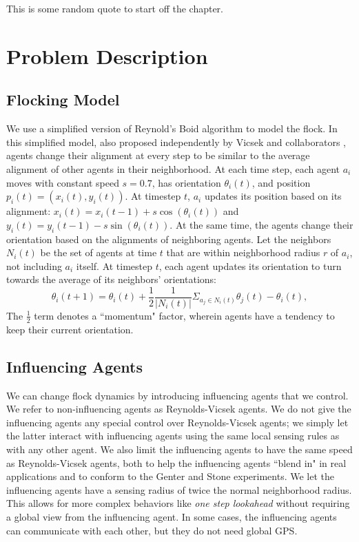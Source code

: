 \begin{savequote}[75mm]
This is some random quote to start off the chapter.
\end{savequote}

\chapter{Problem Description}
\label{ch:problem}

\section{Flocking Model}
We use a simplified version of Reynold's Boid algorithm \cite{reynoldsmodel}
to model the flock.
In this simplified model, also proposed independently by Vicsek and
collaborators \cite{vicsek1995},
agents change their alignment at every step to be similar to the average
alignment of other agents in their neighborhood.
At each time step, each agent $a_i$ moves with constant speed $s=0.7$, has
orientation $\theta_i(t)$, and position $p_i(t) = (x_i(t), y_i(t))$.
At timestep $t$, $a_i$ updates its position based on its alignment:
$x_i(t) = x_i(t-1) + s\cos(\theta_i(t))$ and
$y_i(t) = y_i (t-1) - s\sin(\theta_i(t))$.
At the same time, the agents change their orientation based on the alignments
of neighboring agents.
Let the neighbors $N_i(t)$ be the set of agents at time $t$ that are within
neighborhood radius $r$ of $a_i$, not including $a_i$ itself.
At timestep $t$, each agent updates its orientation to turn towards the average
of its neighbors' orientations:
\[\theta_i(t+1)=\theta_i(t)+\frac{1}{2}\frac{1}{|N_i(t)|} \Sigma_{a_j \in
N_i(t)} \theta_j(t) - \theta_i(t),\]
The $\frac{1}{2}$ term denotes a ``momentum" factor, wherein agents have
a tendency to keep their current orientation.

\section{Influencing Agents}
We can change flock dynamics by introducing influencing agents that we control.
We refer to non-influencing agents as Reynolds-Vicsek agents.
We do not give the influencing agents any special control over Reynolds-Vicsek
agents; we simply let the latter interact with influencing agents using the
same local sensing rules as with any other agent.
We also limit the influencing agents to have the same speed as Reynolds-Vicsek
agents, both to help the influencing agents ``blend in" in real applications
and to conform to the Genter and Stone experiments.
We let the influencing agents have a sensing radius of twice the normal
neighborhood radius.
This allows for more complex behaviors like \textit{one step lookahead}
without requiring a global view from the influencing agent.
In some cases, the influencing agents can communicate with each other, but
they do not need global GPS.


